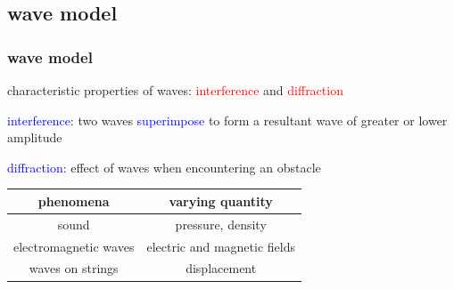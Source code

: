 \documentclass[12pt,xcolor=svgnames,handout]{beamer}
\newcommand{\tightframetitle}[1]{ %
\frametitle{#1}\vspace{-.6\baselineskip}}
\begin{document}
\subsection{wave model}
\begin{frame}
\tightframetitle{wave model}

\begin{block}{}
characteristic properties of waves: \textcolor{red}{interference} and \textcolor{red}{diffraction}

\textcolor{blue}{interference}: two waves \textcolor{blue}{superimpose} to form a resultant wave of greater or lower amplitude

\textcolor{blue}{diffraction}: effect of waves when encountering an obstacle
\end{block}

\pause

\begin{block}{}
\centering
\begin{tabular}{|c|c|}
\hline
phenomena & varying quantity \\ \hline \hline
sound & pressure, density \\ \hline
electromagnetic waves & electric and magnetic fields\\ \hline
waves on strings & displacement\\ \hline
\end{tabular}
\end{block}

\end{frame}

\end{document}
